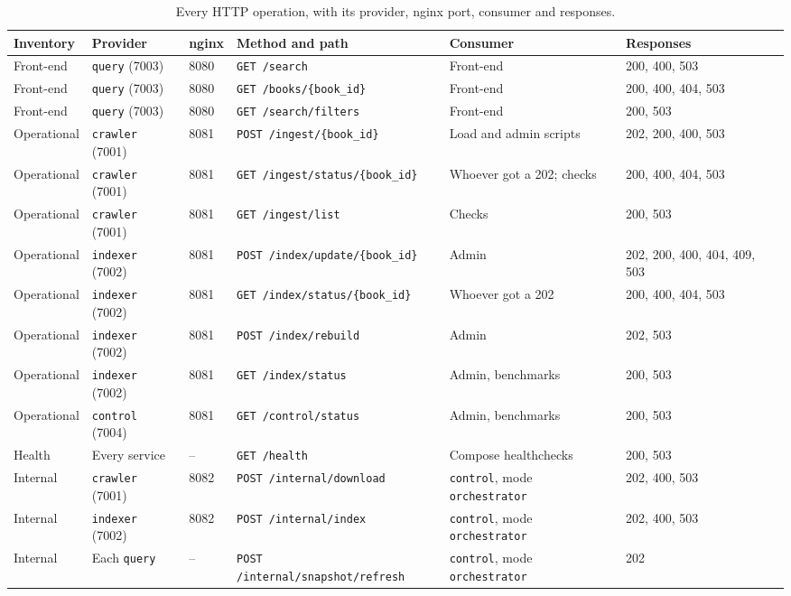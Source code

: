 \documentclass[11pt,a4paper]{article}
\newcommand{\code}[1]{\nolinkurl{#1}}
\newcommand{\mode}[1]{\code{#1}}
\begin{document}
\begin{table}[!ht]
\centering
\footnotesize
\caption{Every HTTP operation, with its provider, nginx port, consumer and responses.}
\label{tab:endpoints}
\begin{tabularx}{\textwidth}{@{}L{1.75cm}L{1.95cm}L{0.95cm}L{4.15cm}L{2.6cm}Y@{}}
\toprule
Inventory & Provider & nginx & Method and path & Consumer & Responses \\
\midrule
Front-end & \code{query} (7003) & 8080 & \code{GET /search} & Front-end & 200, 400, 503 \\
Front-end & \code{query} (7003) & 8080 & \code{GET /books/{book_id}} & Front-end & 200, 400, 404, 503 \\
Front-end & \code{query} (7003) & 8080 & \code{GET /search/filters} & Front-end & 200, 503 \\
Operational & \code{crawler} (7001) & 8081 & \code{POST /ingest/{book_id}} & Load and admin scripts & 202, 200, 400, 503 \\
Operational & \code{crawler} (7001) & 8081 & \code{GET /ingest/status/{book_id}} & Whoever got a 202; checks & 200, 400, 404, 503 \\
Operational & \code{crawler} (7001) & 8081 & \code{GET /ingest/list} & Checks & 200, 503 \\
Operational & \code{indexer} (7002) & 8081 & \code{POST /index/update/{book_id}} & Admin & 202, 200, 400, 404, 409, 503 \\
Operational & \code{indexer} (7002) & 8081 & \code{GET /index/status/{book_id}} & Whoever got a 202 & 200, 400, 404, 503 \\
Operational & \code{indexer} (7002) & 8081 & \code{POST /index/rebuild} & Admin & 202, 503 \\
Operational & \code{indexer} (7002) & 8081 & \code{GET /index/status} & Admin, benchmarks & 200, 503 \\
Operational & \code{control} (7004) & 8081 & \code{GET /control/status} & Admin, benchmarks & 200, 503 \\
Health & Every service & -- & \code{GET /health} & Compose healthchecks & 200, 503 \\
Internal & \code{crawler} (7001) & 8082 & \code{POST /internal/download} & \code{control}, mode \mode{orchestrator} & 202, 400, 503 \\
Internal & \code{indexer} (7002) & 8082 & \code{POST /internal/index} & \code{control}, mode \mode{orchestrator} & 202, 400, 503 \\
Internal & Each \code{query} & -- & \code{POST /internal/snapshot/refresh} & \code{control}, mode \mode{orchestrator} & 202 \\
\bottomrule
\end{tabularx}
\end{table}
\end{document}

